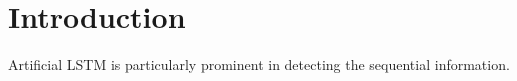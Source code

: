 \section{Introduction}
Artificial 
LSTM is particularly prominent in detecting the sequential information. 